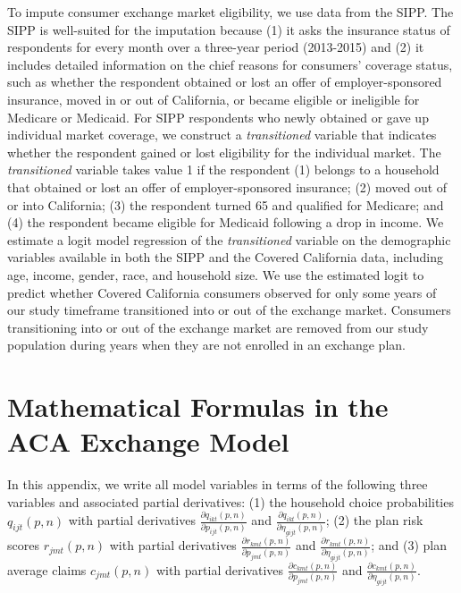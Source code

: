 \documentclass[12pt]{article}
\begin{document}
To impute consumer exchange market eligibility, we use data from the SIPP. The SIPP is well-suited for the imputation because (1) it asks the insurance status of respondents for every month over a three-year period (2013-2015) and (2) it includes detailed information on the chief reasons for consumers' coverage status, such as whether the respondent obtained or lost an offer of employer-sponsored insurance, moved in or out of California, or became eligible or ineligible for Medicare or Medicaid. For SIPP respondents who newly obtained or gave up individual market coverage, we construct a \textit{transitioned} variable that indicates whether the respondent gained or lost eligibility for the individual market. The \textit{transitioned} variable takes value 1 if the respondent (1) belongs to a household that obtained or lost an offer of employer-sponsored insurance; (2) moved out of or into California; (3) the respondent turned 65 and qualified for Medicare; and (4) the respondent became eligible for Medicaid following a drop in income. We estimate a logit model regression of the \textit{transitioned} variable on the demographic variables available in both the SIPP and the Covered California data, including age, income, gender, race, and household size. We use the estimated logit to predict whether Covered California consumers observed for only some years of our study timeframe transitioned into or out of the exchange market. Consumers transitioning into or out of the exchange market are removed from our study population during years when they are not enrolled in an exchange plan. 

\newpage

\section{Mathematical Formulas in the ACA Exchange Model}
\label{app::model_formulas}

\noindent In this appendix, we write all model variables in terms of the following three variables and associated partial derivatives: (1) the household choice probabilities $q_{ijt}(\textit{p},\textit{n})$ with partial derivatives $\frac{ \partial q_{ikt}(\textit{p},\textit{n})}{\partial p_{ijt}(\textit{p},\textit{n})}$ and $\frac{\partial q_{ikt}(\textit{p},\textit{n})}{\partial \eta_{gijt}(\textit{p},\textit{n})}$; (2) the plan risk scores $r_{jmt}(\textit{p},\textit{n})$ with partial derivatives $\frac{\partial r_{kmt}(\textit{p},\textit{n})}{\partial p_{jmt}(\textit{p},\textit{n})}$ and $\frac{\partial r_{kmt}(\textit{p},\textit{n})}{\partial \eta_{gijt}(\textit{p},\textit{n})}$; and (3) plan average claims $c_{jmt}(\textit{p},\textit{n})$ with partial derivatives $ \frac{\partial c_{kmt}(\textit{p},\textit{n})}{\partial p_{jmt}(\textit{p},\textit{n})}$ and $\frac{\partial c_{kmt}(\textit{p},\textit{n})}{\partial \eta_{gijt}(\textit{p},\textit{n})}$.		
	
\end{document}
